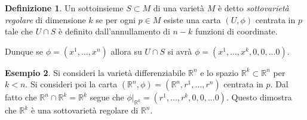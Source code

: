 \documentclass[12pt,a4paper]{report}
\theoremstyle{definition}
\newtheorem{Def}{Definizione}[chapter]
\theoremstyle{definition}
\newtheorem{Ex}[Def]{Esempio}
\theoremstyle{definition}
\theoremstyle{definition}
\begin{document}
\begin{Def}
	Un sottoinsieme $S\subset M$ di una varietà $M$ è detto \textit{sottovarietà regolare} di dimensione $k$ se per ogni $p\in M$ esiste una carta $(U,\phi)$ centrata in $p$ tale che $U\cap S$ è definito dall'annullamento di $n-k$ funzioni di coordinate.
\end{Def}
Dunque se $\phi=(x^1,...,x^n)$ allora su $U\cap S$ si avrà $\phi=(x^1,...,x^k,0,0,...0)$.
\begin{Ex}
	Si consideri la varietà differenziabile $\mathbb{R}^n$ e lo spazio $\mathbb{R}^k\subset\mathbb{R}^n$ per $k<n$. Si consideri poi la carta $(\mathbb{R}^n,\phi)=(\mathbb{R}^n,r^1,...,r^n)$ centrata in $p$. Dal fatto che $\mathbb{R}^n\cap \mathbb{R}^k=\mathbb{R}^k$ segue che $\phi|_{\mathbb{R}^k}=(r^1,...,r^k,0,0,...0)$. Questo dimostra che $\mathbb{R}^k$ è una sottovarietà regolare di $\mathbb{R}^n$.
\end{Ex}
\end{document}

